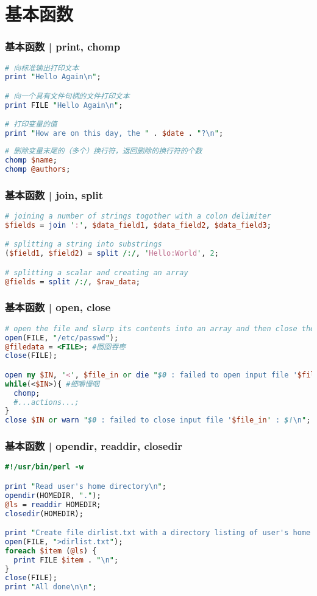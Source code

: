 \section{基本函数}
\begin{frame}[fragile]
  \frametitle{基本函数 | \alert{print, chomp}}
\begin{lstlisting}[language=Perl]
# 向标准输出打印文本
print "Hello Again\n";

# 向一个具有文件句柄的文件打印文本
print FILE "Hello Again\n";

# 打印变量的值
print "How are on this day, the " . $date . "?\n";
\end{lstlisting}
\pause
\begin{lstlisting}[language=Perl]
# 删除变量末尾的（多个）换行符，返回删除的换行符的个数
chomp $name;
chomp @authors;
\end{lstlisting}
\end{frame}

\begin{frame}[fragile]
  \frametitle{基本函数 | \alert{join, split}}
\begin{lstlisting}[language=Perl]
# joining a number of strings togother with a colon delimiter
$fields = join ':', $data_field1, $data_field2, $data_field3;

# splitting a string into substrings
($field1, $field2) = split /:/, 'Hello:World', 2;

# splitting a scalar and creating an array
@fields = split /:/, $raw_data;
\end{lstlisting}
\end{frame}

\begin{frame}[fragile]
  \frametitle{基本函数 | \alert{open, close}}
\begin{lstlisting}[language=Perl]
# open the file and slurp its contents into an array and then close the file
open(FILE, "/etc/passwd");
@filedata = <FILE>; #囫囵吞枣
close(FILE);

open my $IN, '<', $file_in or die "$0 : failed to open input file '$file_in' : $!\n";
while(<$IN>){ #细嚼慢咽
  chomp;
  #...actions...;
}
close $IN or warn "$0 : failed to close input file '$file_in' : $!\n";
\end{lstlisting}
\end{frame}

\begin{frame}[fragile]
  \frametitle{基本函数 | opendir, readdir, closedir}
\begin{lstlisting}[language=Perl]
#!/usr/bin/perl -w

print "Read user's home directory\n";
opendir(HOMEDIR, ".");
@ls = readdir HOMEDIR;
closedir(HOMEDIR);

print "Create file dirlist.txt with a directory listing of user's home dir\n";
open(FILE, ">dirlist.txt");
foreach $item (@ls) {
  print FILE $item . "\n";
}
close(FILE);
print "All done\n\n";
\end{lstlisting}
\end{frame}

